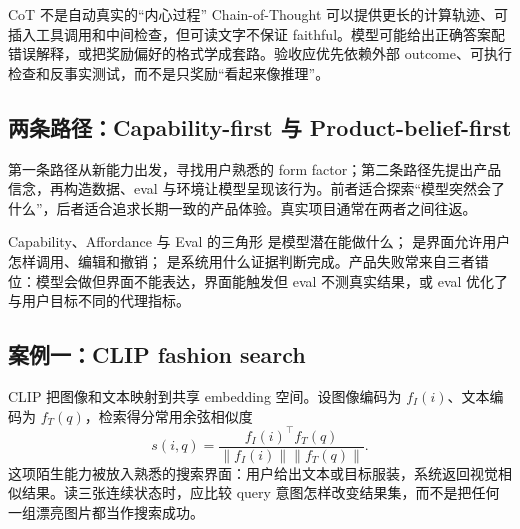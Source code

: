 
\begin{warningbox}{CoT 不是自动真实的“内心过程”}
Chain-of-Thought 可以提供更长的计算轨迹、可插入工具调用和中间检查，但可读文字不保证 faithful。模型可能给出正确答案配错误解释，或把奖励偏好的格式学成套路。验收应优先依赖外部 outcome、可执行检查和反事实测试，而不是只奖励“看起来像推理”。
\end{warningbox}



\subsection{两条路径：Capability-first 与 Product-belief-first}

第一条路径从新能力出发，寻找用户熟悉的 form factor；第二条路径先提出产品信念，再构造数据、eval 与环境让模型呈现该行为。前者适合探索“模型突然会了什么”，后者适合追求长期一致的产品体验。真实项目通常在两者之间往返。



\begin{importantbox}{Capability、Affordance 与 Eval 的三角形}
 是模型潜在能做什么； 是界面允许用户怎样调用、编辑和撤销； 是系统用什么证据判断完成。产品失败常来自三者错位：模型会做但界面不能表达，界面能触发但 eval 不测真实结果，或 eval 优化了与用户目标不同的代理指标。
\end{importantbox}

\subsection{案例一：CLIP fashion search}

CLIP 把图像和文本映射到共享 embedding 空间。设图像编码为 $f_I(i)$、文本编码为 $f_T(q)$，检索得分常用余弦相似度
\[
s(i,q)=\frac{f_I(i)^{\top}f_T(q)}{\lVert f_I(i)\rVert\lVert f_T(q)\rVert}.
\]
这项陌生能力被放入熟悉的搜索界面：用户给出文本或目标服装，系统返回视觉相似结果。读三张连续状态时，应比较 query 意图怎样改变结果集，而不是把任何一组漂亮图片都当作搜索成功。

